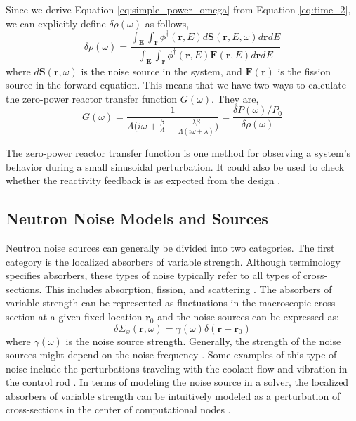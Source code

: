 Since we derive Equation \ref{eq:simple_power_omega} from Equation \ref{eq:time_2}, we can explicitly define $\delta \rho(\omega)$ as follows,
\begin{equation}
        \delta \rho(\omega) = \frac{\int_{\textbf{E}} \int_{\textbf{r}} \phi^{\dagger}(\textbf{r}, E) d\textbf{S}(\textbf{r}, E, \omega) d\textbf{r} dE}{\int_{\textbf{E}} \int_{\textbf{r}} \phi^{\dagger}(\textbf{r}, E) \textbf{F}(\textbf{r}, E) d\textbf{r} dE}
\end{equation}
where $d\textbf{S}(\textbf{r}, \omega)$ is the noise source in the system, and $\textbf{F}(\textbf{r})$  is the fission source in the forward equation. This means that we have two ways to calculate the zero-power reactor transfer function $G(\omega)$. They are,
\begin{equation}
        G(\omega) = \frac{1}{\Lambda \biggl( i \omega +  \frac{\beta}{\Lambda} - \frac{\lambda \beta}{\Lambda (i \omega + \lambda)} \biggr)} = \frac{\delta P (\omega) /P_0}{\delta \rho(\omega)}
\end{equation}

The zero-power reactor transfer function is one method for observing a system's behavior during a small sinusoidal perturbation. It could also be used to check whether the reactivity feedback is as expected from the design \cite{bellNuclearReactorTheory1970}.

\subsection{Neutron Noise Models and Sources}

Neutron noise sources can generally be divided into two categories. The first category is the localized absorbers of variable strength. Although terminology specifies absorbers, these types of noise typically refer to all types of cross-sections. This includes absorption, fission, and scattering \cite{pazsitNoiseTechniquesNuclear2010}. The absorbers of variable strength can be represented as fluctuations in the macroscopic cross-section at a given fixed location $\textbf{r}_0$ and the noise sources can be expressed as:
\begin{equation}
        \delta \Sigma_x (\textbf{r}, \omega) = \gamma (\omega) \delta (\textbf{r} - \textbf{r}_0)
\end{equation}
where $\gamma (\omega)$ is the noise source strength. Generally, the strength of the noise sources might depend on the noise frequency \cite{pazsitNoiseTechniquesNuclear2010}. Some examples of this type of noise include the perturbations traveling with the coolant flow \cite{jonssonTwogroupTheoryNeutron2011} and vibration in the control rod \cite{pazsitNeutronNoiseDiagnostics1983}. In terms of modeling the noise source in a solver, the localized absorbers of variable strength can be intuitively modeled as a perturbation of cross-sections in the center of computational nodes \cite{mylonakisCORESIMFlexible2021}.

